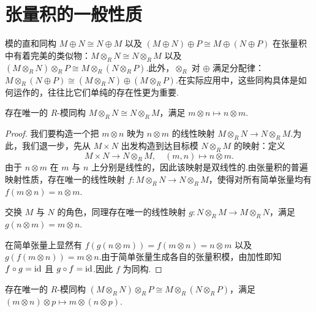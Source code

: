 \section{张量积的一般性质}
\label{sec:properties}

模的直和同构 $M \oplus N \cong N \oplus M$ 以及 $(M \oplus N) \oplus P \cong M \oplus (N \oplus P)$ 在张量积中有着完美的类似物：$M \otimes_R N \cong N \otimes_R M$ 以及 $(M \otimes_R N) \otimes_R P \cong M \otimes_R (N \otimes_R P)$.此外，$\otimes_R$ 对 $\oplus$ 满足分配律：$M \otimes_R (N \oplus P) \cong (M \otimes_R N) \oplus (M \otimes_R P)$.在实际应用中，这些同构具体是如何运作的，往往比它们单纯的存在性更为重要.

\begin{theorem}[交换性]\label{thm:tensor-comm}
存在唯一的 $R$-模同构 $M \otimes_R N \cong N \otimes_R M$，满足 $m \otimes n \mapsto n \otimes m$.
\end{theorem}

\begin{proof}
我们要构造一个把 $m \otimes n$ 映为 $n \otimes m$ 的线性映射 $M \otimes_R N \to N \otimes_R M$.为此，我们退一步，先从 $M \times N$ 出发构造到达目标模 $N \otimes_R M$ 的映射：定义
\[
  M \times N \to N \otimes_R M, \quad (m, n) \mapsto n \otimes m.
\]
由于 $n \otimes m$ 在 $m$ 与 $n$ 上分别是线性的，因此该映射是双线性的.由张量积的普遍映射性质，存在唯一的线性映射 $f \colon M \otimes_R N \to N \otimes_R M$，使得对所有简单张量均有 $f(m \otimes n) = n \otimes m$.

交换 $M$ 与 $N$ 的角色，同理存在唯一的线性映射 $g \colon N \otimes_R M \to M \otimes_R N$，满足 $g(n \otimes m) = m \otimes n$.

在简单张量上显然有 $f(g(n \otimes m)) = f(m \otimes n) = n \otimes m$ 以及 $g(f(m \otimes n)) = m \otimes n$.由于简单张量生成各自的张量积模，由加性即知 $f \circ g = \operatorname{id}$ 且 $g \circ f = \operatorname{id}$.因此 $f$ 为同构.
\end{proof}

\begin{theorem}[结合律]\label{thm:tensor-assoc}
存在唯一的 $R$-模同构 $(M \otimes_R N) \otimes_R P \cong M \otimes_R (N \otimes_R P)$，满足 $(m \otimes n) \otimes p \mapsto m \otimes (n \otimes p)$.
\end{theorem}

